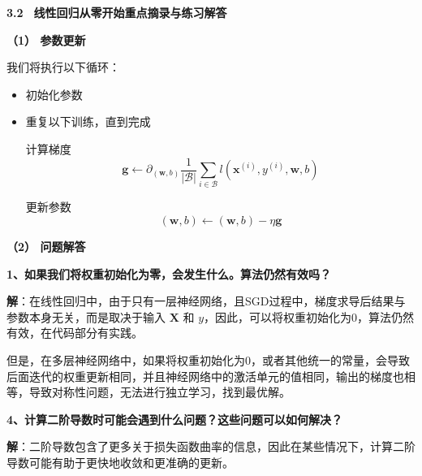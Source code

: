 \documentclass[UTF8]{ctexart}
\begin{document}
	\setlength{\abovedisplayskip}{2pt}
	\setlength{\belowdisplayskip}{2pt}
	\setlength{\abovedisplayshortskip}{2pt}
	\setlength{\belowdisplayshortskip}{2pt}
	\begin{center}
		\heiti{}\textbf{3.2 \, 线性回归从零开始重点摘录与练习解答} %
		\vspace{2ex}
	\end{center}
	
	
	\pagestyle{fancy}
	\lhead{}
	\chead{}
	\rhead{}
	\cfoot{\thepage}
	\renewcommand{\headrulewidth}{0pt}
	\renewcommand{\footrulewidth}{0pt} %
	
	\textbf{（1） 参数更新}
	
	我们将执行以下循环：
	\begin{itemize}
		\item 初始化参数
		\item 重复以下训练，直到完成
		
		计算梯度
		\[
		\mathbf{g} \leftarrow \partial_{(\mathbf{w},b)} \frac{1}{|\mathcal{B}|} \sum_{i \in \mathcal{B}} l(\mathbf{x}^{(i)}, y^{(i)}, \mathbf{w}, b)
		\]
		
		更新参数
		\[
		(\mathbf{w}, b) \leftarrow (\mathbf{w}, b) - \eta \mathbf{g}
		\]
	\end{itemize}
	
	\textbf{（2） 问题解答}
	
	\textbf{1、如果我们将权重初始化为零，会发生什么。算法仍然有效吗？}
	
	\noindent \textbf{解}：在线性回归中，由于只有一层神经网络，且SGD过程中，梯度求导后结果与参数本身无关，而是取决于输入 $\bm{X}$ 和 $y$，因此，可以将权重初始化为0，算法仍然有效，在代码部分有实践。
		
	但是，在多层神经网络中，如果将权重初始化为0，或者其他统一的常量，会导致后面迭代的权重更新相同，并且神经网络中的激活单元的值相同，输出的梯度也相等，导致对称性问题，无法进行独立学习，找到最优解。
	
	\textbf{4、计算二阶导数时可能会遇到什么问题？这些问题可以如何解决？}
	
	\noindent \textbf{解}：二阶导数包含了更多关于损失函数曲率的信息，因此在某些情况下，计算二阶导数可能有助于更快地收敛和更准确的更新。
		
\end{document}

